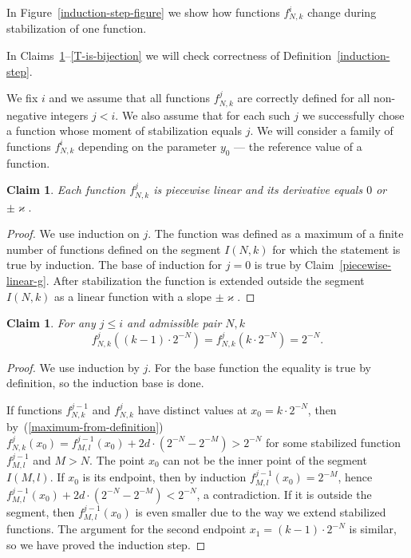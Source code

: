 \documentclass[12pt]{article}
\newtheorem{clai}[prop]{Claim}
\theoremstyle{definition}
\begin{document}
In Figure~\ref{induction-step-figure} we show how functions $f_{N,k}^i$ change during stabilization of one function.

In Claims~\ref{derivative-claim}--\ref{T-is-bijection} we will check correctness of Definition~\ref{induction-step}.

We fix $i$ and we assume that all functions $f_{N,k}^j$ are correctly defined for all non-negative integers $j < i.$ We also assume that for each such $j$ we successfully chose a function whose moment of stabilization equals $j$. We will consider a family of functions $f_{N,k}^i$ depending on the parameter $y_0$ --- the reference value of a function.

\begin{clai}\label{derivative-claim}
Each function $f_{N,k}^j$ is piecewise linear and its derivative equals $0$ or $\pm\varkappa.$
\end{clai}

\begin{proof}
We use induction on $j$. The function was defined as a maximum of a finite number of functions defined on the segment $I(N,k)$ for which the statement is true by induction.
The base of induction for $j=0$ is true by Claim~\ref{piecewise-linear-g}.
After stabilization the function is extended outside the segment $I(N,k)$ as a linear function with a slope $\pm\varkappa.$
\end{proof}

\begin{clai}
\label{boundary-values}
For any $j\le i$ and admissible pair $N,k$
$$
f_{N,k}^j \left((k-1)\cdot2^{-N}\right) = f_{N,k}^j \left(k\cdot2^{-N}\right) = 2^{-N}.
$$
\end{clai}

\begin{proof}
We use induction by $j$. For the base function the equality is true by definition, so the induction base is done. 

If functions $f_{N,k}^{j-1}$ and $f_{N,k}^j$ have distinct values at  $x_0=k\cdot2^{-N}$, then by~(\ref{maximum-from-definition}) $f_{N,k}^j(x_0)= f_{M,l}^{j-1}(x_0) + 2d\cdot \left(2^{-N}-2^{-M}\right)>2^{-N}$ for some stabilized function $f_{M,l}^{j-1}$ and $M>N$. The point $x_0$ can not be the inner point of the segment $I(M,l)$. If $x_0$ is its endpoint, then by induction $f_{M,l}^{j-1}(x_0)=2^{-M}$, hence $ f_{M,l}^{j-1}(x_0) + 2d\cdot \left(2^{-N}-2^{-M}\right)<2^{-N}$, a contradiction. If it is outside the segment, then  $f_{M,l}^{j-1}(x_0)$ is even smaller due to the way we extend stabilized functions. The argument for the second endpoint $x_1=(k-1)\cdot2^{-N}$ is similar, so we have proved the induction step.
\end{proof}
\end{document}
